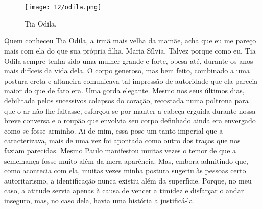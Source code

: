 \chapter{}

\begin{figure}
\centering
\texttt{[image: 12/odila.png]}
\caption{Tia Odila.}
\end{figure}

Quem conheceu Tia Odila, a irmã mais velha da mamãe, acha que eu me pareço mais com ela do que sua própria filha, Maria Sílvia.
Talvez porque como eu, Tia Odila sempre tenha sido uma mulher grande e forte, obesa até, durante os anos mais difíceis da vida dela.
O corpo generoso, mas bem feito, combinado a uma postura ereta e altaneira comunicava tal impressão de autoridade que ela parecia maior do que de fato era.
Uma gorda elegante.
Mesmo nos seus últimos dias, debilitada pelos sucessivos colapsos do coração, recostada numa poltrona para que o ar não lhe faltasse, esforçou-se por manter a cabeça erguida durante nossa breve conversa e o roupão que envolvia seu corpo definhado ainda era envergado como se fosse arminho.
Ai de mim, essa pose um tanto imperial que a caracterizava, mais de uma vez foi apontada como outro dos traços que nos faziam parecidas.
Mesmo Paulo manifestou muitas vezes o temor de que a semelhança fosse muito além da mera aparência.
Mas, embora admitindo que, como acontecia com ela, muitas vezes minha postura sugeriu às pessoas certo autoritarismo, a identificação nunca existiu além da superfície.
Porque, no meu caso, a atitude servia apenas à causa de vencer a timidez e disfarçar o andar inseguro, mas, no caso dela, havia uma história a justificá-la.


